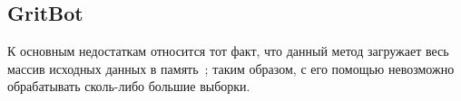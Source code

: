 ﻿\subsection{GritBot}
К основным недостаткам относится тот факт, что данный метод загружает весь массив исходных данных в память~\cite{BaySchwabacherOrca}; таким образом, с его помощью невозможно обрабатывать сколь-либо большие выборки.